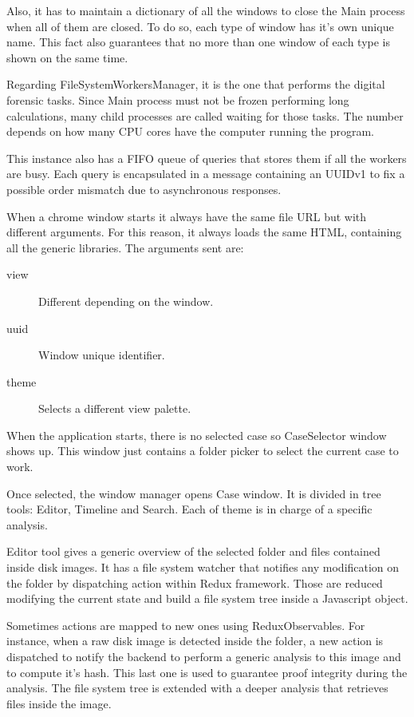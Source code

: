 Also, it has to maintain a dictionary of all the windows to close the Main
process when all of them are closed. To do so, each type of window has it's own
unique name. This fact also guarantees that no more than one window of each type
is shown on the same time. 

Regarding FileSystemWorkersManager, it is the one that performs the digital
forensic tasks. Since Main process must not be frozen performing long
calculations, many child processes are called waiting for those tasks. The
number depends on how many CPU cores have the computer running the program.

This instance also has a FIFO queue of queries that stores them if all the
workers are busy. Each query is encapsulated in a message containing an UUIDv1
to fix a possible order mismatch due to asynchronous responses.



When a chrome window starts it always have the same file URL but with different
arguments. For this reason, it always loads the same HTML, containing all the
generic libraries. The arguments sent are: 

\begin{description}
	\item[view] Different depending on the window.
	\item[uuid] Window unique identifier. 
	\item[theme] Selects a different view palette.
\end{description}

When the application starts, there is no selected case so CaseSelector window 
shows up. This window just contains a folder picker to select the current case
to work.

Once selected, the window manager opens Case window. It is divided in tree
tools: Editor, Timeline and Search. Each of theme is in charge of a specific
analysis.

Editor tool gives a generic overview of the selected folder and files contained 
inside disk images. It has a file system watcher that notifies any modification
on the folder by dispatching action within Redux framework. Those are reduced
modifying the current state and build a file system tree inside a Javascript
object.

Sometimes actions are mapped to new ones using ReduxObservables. For instance,
when a raw disk image is detected inside the folder, a new action is dispatched
to notify the backend to perform a generic analysis to this image and to 
compute it's hash. This last one is used to guarantee proof integrity during
the analysis. The file system tree is extended with a deeper analysis that
retrieves files inside the image.


